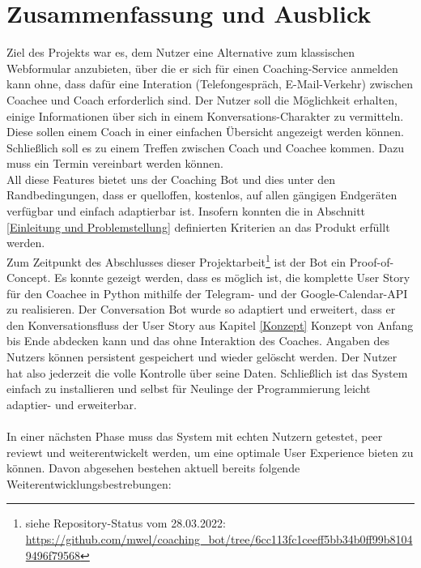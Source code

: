 \label{Zusammenfassung und Ausblick}
\chapter{Zusammenfassung und Ausblick}

    Ziel des Projekts war es, dem Nutzer eine Alternative zum klassischen Webformular anzubieten, über die er sich für einen Coaching-Service anmelden kann ohne, dass dafür eine Interation (Telefongespräch, E-Mail-Verkehr) zwischen Coachee und Coach erforderlich sind. Der Nutzer soll die Möglichkeit erhalten, einige Informationen über sich in einem Konversations-Charakter zu vermitteln. Diese sollen einem Coach in einer einfachen Übersicht angezeigt werden können. Schließlich soll es zu einem Treffen zwischen Coach und Coachee kommen. Dazu muss ein Termin vereinbart werden können. \\
    All diese Features bietet uns der Coaching Bot und dies unter den Randbedingungen, dass er quelloffen, kostenlos, auf allen gängigen Endgeräten verfügbar und einfach adaptierbar ist. Insofern konnten die in Abschnitt \ref*{Einleitung und Problemstellung} definierten Kriterien an das Produkt erfüllt werden. \\
    
    Zum Zeitpunkt des Abschlusses dieser Projektarbeit\footnote{siehe Repository-Status vom 28.03.2022: \url{https://github.com/mwel/coaching_bot/tree/6cc113fc1ceeff5bb34b0ff99b81049496f79568}} ist der Bot ein Proof-of-Concept. Es konnte gezeigt werden, dass es möglich ist, die komplette User Story für den Coachee in Python mithilfe der Telegram- und der Google-Calendar-API zu realisieren. Der Conversation Bot wurde so adaptiert und erweitert, dass er den Konversationsfluss der User Story aus Kapitel \ref*{Konzept} Konzept von Anfang bis Ende abdecken kann und das ohne Interaktion des Coaches. Angaben des Nutzers können persistent gespeichert und wieder gelöscht werden. Der Nutzer hat also jederzeit die volle Kontrolle über seine Daten. Schließlich ist das System einfach zu installieren und selbst für Neulinge der Programmierung leicht adaptier- und erweiterbar.\\
    \\
    In einer nächsten Phase muss das System mit echten Nutzern getestet, peer reviewt und weiterentwickelt werden, um eine optimale User Experience bieten zu können. Davon abgesehen bestehen aktuell bereits folgende Weiterentwicklungsbestrebungen: 

